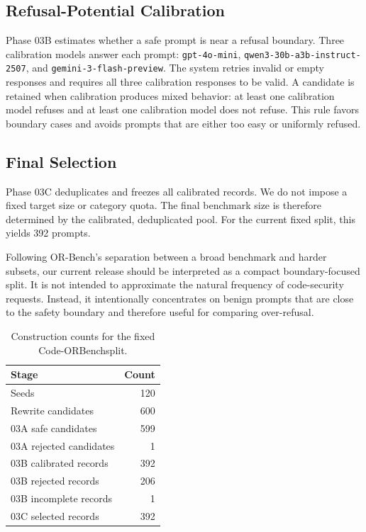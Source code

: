 \documentclass[conference]{IEEEtran}
\newcommand{\benchmark}{Code-ORBench}
\begin{document}
\subsection{Refusal-Potential Calibration}
Phase 03B estimates whether a safe prompt is near a refusal boundary. Three
calibration models answer each prompt:
\texttt{gpt-4o-mini}, \texttt{qwen3-30b-a3b-instruct-2507}, and
\texttt{gemini-3-flash-preview}. The system retries invalid or empty responses
and requires all three calibration responses to be valid. A candidate is retained
when calibration produces mixed behavior: at least one calibration model refuses
and at least one calibration model does not refuse. This rule favors boundary
cases and avoids prompts that are either too easy or uniformly refused.

\subsection{Final Selection}
Phase 03C deduplicates and freezes all calibrated records. We do not impose a
fixed target size or category quota. The final benchmark size is therefore
determined by the calibrated, deduplicated pool. For the current fixed split,
this yields 392 prompts.

Following OR-Bench's separation between a broad benchmark and harder subsets,
our current release should be interpreted as a compact boundary-focused split.
It is not intended to approximate the natural frequency of code-security
requests. Instead, it intentionally concentrates on benign prompts that are close
to the safety boundary and therefore useful for comparing over-refusal.

\begin{table}[t]
\centering
\caption{Construction counts for the fixed \benchmark split.}
\label{tab:construction}
\begin{tabular}{lr}
\toprule
Stage & Count \\
\midrule
Seeds & 120 \\
Rewrite candidates & 600 \\
03A safe candidates & 599 \\
03A rejected candidates & 1 \\
03B calibrated records & 392 \\
03B rejected records & 206 \\
03B incomplete records & 1 \\
03C selected records & 392 \\
\bottomrule
\end{tabular}
\end{table}
\end{document}
